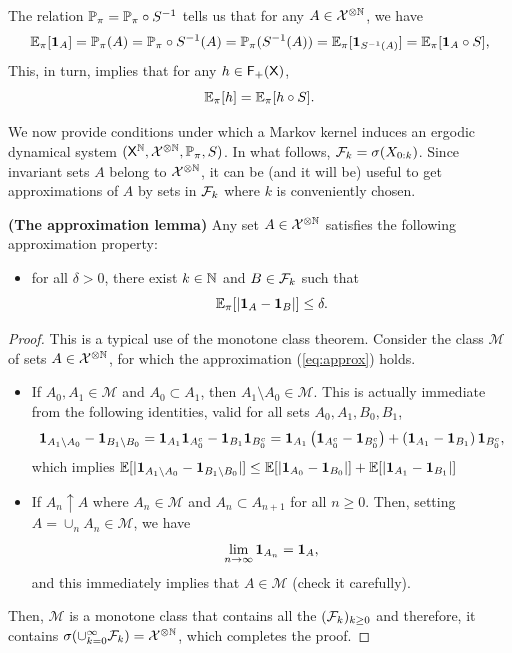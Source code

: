 \documentclass[english,graybox,envcountchap,envcountsame,sectrefs,shortlabels]{svmono}
\theoremstyle{style}
\begin{document}
The relation $\mathbb{P}_{\pi}=\mathbb{P}_{\pi}\circ S^{-1}$ tells us that for
any $A\in\mathcal{X}^{\otimes\mathbb{N}}$, we have
\[
\mathbb{E}_{\pi}[\mathbf{1}_{A}]=\mathbb{P}_{\pi}(A)=\mathbb{P}_{\pi}\circ S^{-1}(A)=\mathbb{P}_{\pi}(S^{-1}(A))=\mathbb{E}_{\pi}[\mathbf{1}_{S^{-1}(A)}]=\mathbb{E}_{\pi}[\mathbf{1}_{A}\circ S],
\]
This, in turn, implies that for any $h\in\mathsf{F_{+}}(\mathsf{X})$,
\[
\mathbb{E}_{\pi}[h]=\mathbb{E}_{\pi}[h\circ S].
\]

We now provide conditions under which a Markov kernel induces an ergodic
dynamical system $(\mathsf{X}^{\mathbb{N}},\mathcal{X}^{\otimes\mathbb{N}},\mathbb{P}_{\pi},S)$.
In what follows, $\mathcal{F}_{k}=\sigma(X_{0:k})$. Since invariant sets
$A$ belong to $\mathcal{X}^{\otimes\mathbb{N}}$, it can be (and it will be)
useful to get approximations of $A$ by sets in $\mathcal{F}_{k}$ where
$k$ is conveniently chosen.
\begin{lemma}
\textbf{\label{lem:approx:ind}(The approximation lemma)} Any set $A\in\mathcal{X}^{\otimes\mathbb{N}}$
satisfies the following approximation property:
\begin{itemize}
\item for all $\delta>0$, there exist $k\in\mathbb{N}$ and $B\in\mathcal{F}_{k}$
such that
\begin{equation}
\mathbb{E}_{\pi}[|\mathbf{1}_{A}-\mathbf{1}_{B}|]\leq\delta.\label{eq:approx}
\end{equation}
\end{itemize}
\end{lemma}
\begin{proof}
This is a typical use of the monotone class theorem. Consider the
class $\mathcal{M}$ of sets $A\in\mathcal{X}^{\otimes\mathbb{N}}$, for which
the approximation (\ref{eq:approx}) holds.
\begin{itemize}
\item If $A_{0},A_{1} \in \mathcal{M}$ and $A_{0}\subset A_{1}$, then $A_{1}\setminus A_{0}\in\mathcal{M}$.
This is actually immediate from the following identities, valid for
all sets $A_{0},A_{1},B_{0},B_{1}$,
$$
\mathbf{1}_{A_{1}\setminus A_{0}}-\mathbf{1}_{B_{1}\setminus B_{0}} =\mathbf{1}_{A_{1}}\mathbf{1}_{A_{0}^c}-\mathbf{1}_{B_{1}}\mathbf{1}_{B_{0}^c}=\mathbf{1}_{A_{1}}\left(\mathbf{1}_{A_{0}^c} -\mathbf{1}_{B_0^c}\right)+\left(\mathbf{1}_{A_1}-\mathbf{1}_{B_1}\right)\mathbf{1}_{B_0^c},  
$$
which implies $\mathbb{E}[|\mathbf{1}_{A_{1}\setminus A_{0}}-\mathbf{1}_{B_{1}\setminus B_{0}}|]\leq\mathbb{E}[|\mathbf{1}_{A_{0}}-\mathbf{1}_{B_{0}}|] +\mathbb{E}[|\mathbf{1}_{A_{1}}-\mathbf{1}_{B_{1}}|]$
\item If $A_{n}\uparrow A$ where $A_{n}\in\mathcal{M}$ and $A_{n}\subset A_{n+1}$
for all $n\geq0$. Then, setting $A=\cup_{n}A_{n}\in\mathcal{M}$,
we have
\[
\lim_{n\to\infty}\mathbf{1}_{A_{n}}=\mathbf{1}_{A},
\]
and this immediately implies that $A\in\mathcal{M}$ (check it carefully).
\end{itemize}
Then, $\mathcal{M}$ is a monotone class that contains all the $(\mathcal{F}_{k})_{k\geq0}$
and therefore, it contains $\sigma(\cup_{k=0}^{\infty}\mathcal{F}_{k})=\mathcal{X}^{\otimes\mathbb{N}}$, which completes the proof.
\end{proof}
\end{document}
